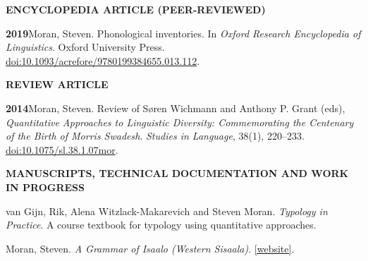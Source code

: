 \documentclass[11pt]{article}
\newcommand{\hangpara}{
 \setlength{\parindent}{0in} %
 \hangindent=0.42in %
}
\begin{document}
\vskip 20pt
\begin{flushleft}
{\bf ENCYCLOPEDIA ARTICLE (PEER-REVIEWED)}
\end{flushleft}

\hangpara
{\bf 2019}\hspace{1ex}Moran, Steven. Phonological inventories. In \textit{Oxford Research Encyclopedia of Linguistics}. Oxford University Press. \href{https://doi.org/10.1093/acrefore/9780199384655.013.112}{doi:10.1093/acrefore/9780199384655.013.112}.

\vskip 20pt
\begin{flushleft}
{\bf REVIEW ARTICLE}
\end{flushleft}


\hangpara
{\bf 2014}\hspace{1ex}Moran, Steven. Review of Søren Wichmann and Anthony P. Grant (eds), \textit{Quantitative Approaches to Linguistic Diversity: Commemorating the Centenary of the Birth of Morris Swadesh}. \textit{Studies in Language}, 38(1), 220--233. \href{https://doi.org/10.1075/sl.38.1.07mor}{doi:10.1075/sl.38.1.07mor}.

\clearpage
\vskip 20pt
\begin{flushleft}
{\bf MANUSCRIPTS, TECHNICAL DOCUMENTATION AND WORK IN PROGRESS}
\end{flushleft}







\hangpara
van Gijn, Rik, Alena Witzlack-Makarevich and Steven Moran. {\it Typology in Practice}. A course textbook for typology using quantitative approaches.

\vskip 6pt
\hangpara
Moran, Steven. \textit{A Grammar of Isaalo (Western Sisaala)}. \href{https://github.com/bambooforest/sisaala}{[website]}.
\end{document}
